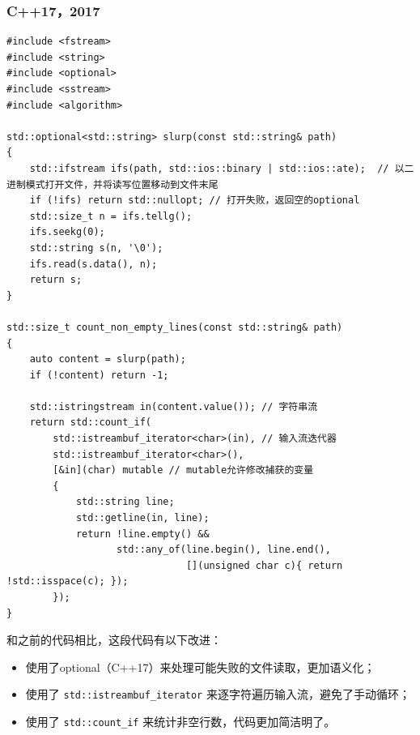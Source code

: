 \subsubsection{C++17，2017}
\begin{verbatim}
#include <fstream>
#include <string>
#include <optional>
#include <sstream>
#include <algorithm>

std::optional<std::string> slurp(const std::string& path)
{
    std::ifstream ifs(path, std::ios::binary | std::ios::ate);  // 以二进制模式打开文件，并将读写位置移动到文件末尾
    if (!ifs) return std::nullopt; // 打开失败，返回空的optional
    std::size_t n = ifs.tellg();
    ifs.seekg(0);
    std::string s(n, '\0');
    ifs.read(s.data(), n);
    return s;
}

std::size_t count_non_empty_lines(const std::string& path)
{
    auto content = slurp(path);
    if (!content) return -1;

    std::istringstream in(content.value()); // 字符串流
    return std::count_if(
        std::istreambuf_iterator<char>(in), // 输入流迭代器
        std::istreambuf_iterator<char>(),
        [&in](char) mutable // mutable允许修改捕获的变量
        {
            std::string line;
            std::getline(in, line);
            return !line.empty() &&
                   std::any_of(line.begin(), line.end(),
                               [](unsigned char c){ return !std::isspace(c); });
        });
}
\end{verbatim}
和之前的代码相比，这段代码有以下改进：
\begin{itemize}
  \item 使用了optional（C++17）来处理可能失败的文件读取，更加语义化；
  \item 使用了 \texttt{std::istreambuf\_iterator} 来逐字符遍历输入流，避免了手动循环；
  \item 使用了 \texttt{std::count\_if} 来统计非空行数，代码更加简洁明了。
\end{itemize}

